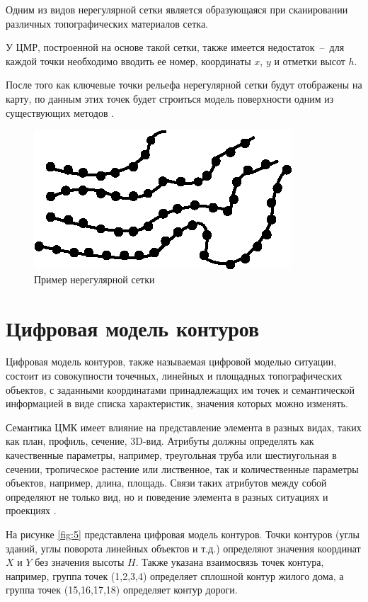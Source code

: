 Одним из видов нерегулярной сетки является образующаяся при сканировании различных топографических материалов сетка.

У ЦМР, построенной на основе такой сетки, также имеется недостаток~--~для каждой точки необходимо вводить ее номер, координаты $x$, $y$ и отметки высот $h$.

После того как ключевые точки рельефа нерегулярной сетки будут отображены на карту, по данным этих точек будет строиться модель поверхности одним из существующих методов \cite{11,18}. 

\begin{figure}[h!]
    \center
    \includegraphics[scale=2.5]{images/unregular.png}
    \caption{Пример нерегулярной сетки}
    \label{fig:4}
\end{figure}

\section{Цифровая модель контуров}

Цифровая модель контуров, также называемая цифровой моделью ситуации, состоит из совокупности точечных, линейных и площадных топографических объектов, с заданными координатами принадлежащих им точек и семантической информацией в виде списка характеристик, значения которых можно изменять. 

Семантика ЦМК имеет влияние на представление элемента в разных видах, таких как план, профиль, сечение, 3D-вид. Атрибуты должны определять как качественные параметры, например, треугольная труба или шестиугольная в сечении, тропическое растение или лиственное, так и количественные параметры объектов, например, длина, площадь. Связи таких атрибутов между собой определяют не только вид, но и поведение элемента в разных ситуациях и проекциях \cite{18,20}.

На рисунке \ref{fig:5} представлена цифровая модель контуров. Точки контуров (углы зданий, углы поворота линейных объектов и т.д.) определяют значения координат $X$ и $Y$ без значения высоты $H$. Также указана взаимосвязь точек контура, например, группа точек (1,2,3,4) определяет сплошной контур жилого дома, а группа точек (15,16,17,18) определяет контур дороги.

